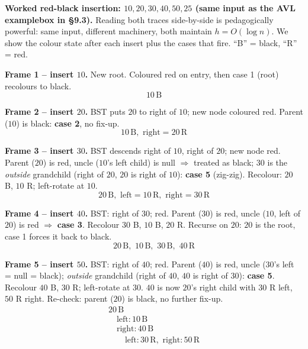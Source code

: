 \documentclass[11pt]{article}
\begin{document}
\begin{examplebox}
\textbf{Worked red-black insertion: $10, 20, 30, 40, 50, 25$ (same
input as the AVL examplebox in \S9.3).} Reading both traces
side-by-side is pedagogically powerful: same input, different
machinery, both maintain $h = O(\log n)$. We show the colour state
after each insert plus the cases that fire. ``B'' = black, ``R'' =
red.

\textbf{Frame 1 -- insert $10$.} New root. Coloured red on entry,
then case 1 (root) recolours to black.
\[
10\,\text{B}
\]

\textbf{Frame 2 -- insert $20$.} BST puts $20$ to right of $10$;
new node coloured red. Parent ($10$) is black: \textbf{case 2}, no
fix-up.
\[
10\,\text{B},\,\, \text{right} = 20\,\text{R}
\]

\textbf{Frame 3 -- insert $30$.} BST descends right of $10$, right
of $20$; new node red. Parent ($20$) is red, uncle ($10$'s left
child) is null $\Rightarrow$ treated as black; $30$ is the
\emph{outside} grandchild (right of $20$, $20$ is right of $10$):
\textbf{case 5} (zig-zig). Recolour: $20$ B, $10$ R; left-rotate at
$10$.
\[
20\,\text{B},\,\, \text{left} = 10\,\text{R},\,\, \text{right} = 30\,\text{R}
\]

\textbf{Frame 4 -- insert $40$.} BST: right of $30$; red. Parent
($30$) is red, uncle ($10$, left of $20$) is red $\Rightarrow$
\textbf{case 3}. Recolour $30$ B, $10$ B, $20$ R. Recurse on $20$:
$20$ is the root, case 1 forces it back to black.
\[
20\,\text{B},\,\, 10\,\text{B},\,\, 30\,\text{B},\,\, 40\,\text{R}
\]

\textbf{Frame 5 -- insert $50$.} BST: right of $40$; red. Parent
($40$) is red, uncle ($30$'s left = null = black);
\emph{outside} grandchild (right of $40$, $40$ is right of $30$):
\textbf{case 5}. Recolour $40$ B, $30$ R; left-rotate at $30$.
$40$ is now $20$'s right child with $30$ R left, $50$ R right.
Re-check: parent ($20$) is black, no further fix-up.
\[
\begin{array}{l}
20\,\text{B} \\
\quad \text{left}: 10\,\text{B} \\
\quad \text{right}: 40\,\text{B} \\
\qquad \text{left}: 30\,\text{R},\,\, \text{right}: 50\,\text{R}
\end{array}
\]


\end{examplebox}
\end{document}
